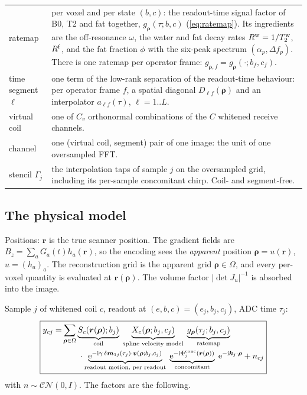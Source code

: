 \documentclass[11pt]{article}
\theoremstyle{remark}
\newcommand{\rr}{\bm r}
\newcommand{\pp}{\bm\rho}
\newcommand{\kk}{\bm k}
\newcommand{\vv}{\bm v}
\newcommand{\ii}{\mathrm i}
\newcommand{\ee}{\mathrm e}
\begin{document}
\begin{center}
\begin{tabularx}{\linewidth}{@{}lX@{}}
ratemap & per voxel and per state $(b,c)$: the readout-time signal factor of B0, T2 and fat together, $g_{\pp}(\tau;b,c)$ (\cref{eq:ratemap}). Its ingredients are the off-resonance $\omega$, the water and fat decay rates $R^{\rm w}=1/T_2^{\rm w}$, $R^{\rm f}$, and the fat fraction $\phi$ with the six-peak spectrum $(\alpha_p,\Delta f_p)$. There is one ratemap per operator frame: $g_{\pp,f}=g_{\pp}(\cdot;b_f,c_f)$.\\
time segment $\ell$ & one term of the low-rank separation of the readout-time behaviour: per operator frame $f$, a spatial diagonal $D_{\ell f}(\pp)$ and an interpolator $a_{\ell f}(\tau)$, $\ell=1..L$.\\
virtual coil & one of $C_v$ orthonormal combinations of the $C$ whitened receive channels.\\
channel & one (virtual coil, segment) pair of one image: the unit of one oversampled FFT.\\
stencil $\Gamma_j$ & the interpolation taps of sample $j$ on the oversampled grid, including its per-sample concomitant chirp. Coil- and segment-free.\\
\bottomrule
\end{tabularx}
\end{center}

\subsection{The physical model}
\label{sec:phys}

Positions: $\rr$ is the true scanner position. The gradient fields are $B_z=\sum_aG_a(t)h_a(\rr)$, so the encoding sees the \emph{apparent} position $\pp=u(\rr)$, $u=(h_a)_a$. The reconstruction grid is the apparent grid $\pp\in\Omega$, and every per-voxel quantity is evaluated at $\rr(\pp)$. The volume factor $|\det J_u|^{-1}$ is absorbed into the image.

Sample $j$ of whitened coil $c$, readout at $(e,b,c)=(e_j,b_j,c_j)$, ADC time $\tau_j$:
\begin{equation}
\boxed{\begin{aligned}
y_{cj}=&\sum_{\pp\in\Omega}
\underbrace{S_c(\rr(\pp);b_j)}_{\text{coil}}\;
\underbrace{X_{e}(\pp;b_j,c_j)}_{\text{spline velocity model}}\;
\underbrace{g_{\pp}(\tau_j;b_j,c_j)}_{\text{ratemap}}\\
&\qquad\cdot\underbrace{\ee^{-\ii\gamma\,\delta\bm m_{1j}(\tau_j)\cdot\vv(\pp;b_j,c_j)}}_{\text{readout motion, per readout}}\;
\underbrace{\ee^{-\ii\Phi^{\rm conc}_j(\rr(\pp))}}_{\text{concomitant}}\;
\ee^{-\ii\kk_j\cdot\pp}
+n_{cj}
\end{aligned}}
\label{eq:chain}
\end{equation}
with $n\sim\mathcal{CN}(0,I)$. The factors are the following.
\end{document}
